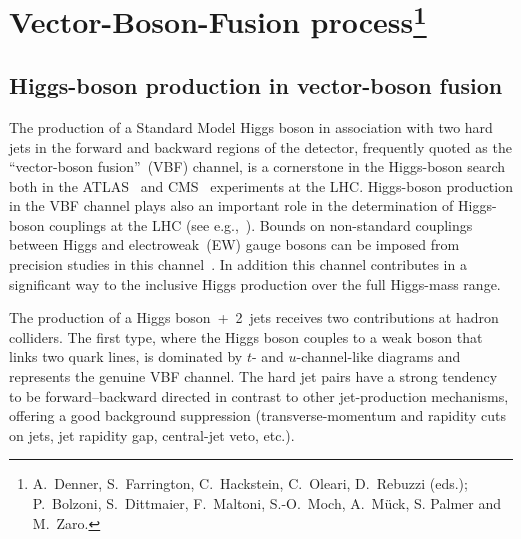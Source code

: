 \section{Vector-Boson-Fusion process\footnote{A.~Denner, S.~Farrington,
  C.~Hackstein, C.~Oleari, D.~Rebuzzi (eds.); P.~Bolzoni, S.~Dittmaier, F.~Maltoni,
  S.-O.~Moch, A.~M\"uck, S. Palmer and M.~Zaro.} }

\providecommand{\lsim}
{\;\raisebox{-.3em}{$\stackrel{\displaystyle <}{\sim}$}\;}
\providecommand{\gsim}
{\;\raisebox{-.3em}{$\stackrel{\displaystyle >}{\sim}$}\;}

\subsection{Higgs-boson production in vector-boson fusion}
\label{sec:intro}
The production of a Standard Model Higgs boson in association with two hard
jets in the forward and backward regions of the detector, frequently quoted
as the ``vector-boson fusion''~(VBF) channel, is a cornerstone in
the Higgs-boson search both in the ATLAS~\cite{Asai:2004ws} and
CMS~\cite{Abdullin:2005yn} experiments at the LHC.  Higgs-boson production in
the VBF channel plays also an important role in the determination of
Higgs-boson couplings at the LHC (see e.g.,\ ). Bounds on
non-standard couplings between Higgs and electroweak~(EW) gauge bosons can be
imposed from precision studies in this channel~\cite{Hankele:2006ma}.
In addition this channel contributes in a significant way to the inclusive Higgs 
production over the full Higgs-mass range.

The production of a Higgs boson~+~2~jets receives two contributions at hadron
colliders. The first type, where the Higgs boson couples to a weak boson that
links two quark lines, is dominated by $t$- and $u$-channel-like diagrams and
represents the genuine VBF channel.  The hard jet pairs have a strong
tendency to be forward--backward directed in contrast to other jet-production
mechanisms, offering a good background suppression (transverse-momentum and
rapidity cuts on jets, jet rapidity gap, central-jet veto, etc.). 

